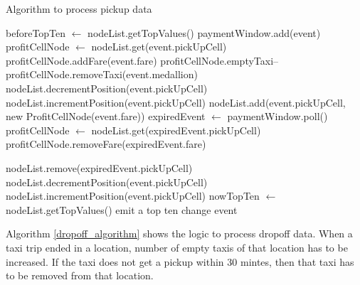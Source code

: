 \begin{algorithm}
\caption{Algorithm to process pickup data}
\label{pickup_algorithm}
\begin{algorithmic}
\small
\STATE beforeTopTen $ \leftarrow $ nodeList.getTopValues()
\STATE paymentWindow.add(event)
	\STATE profitCellNode $ \leftarrow $ nodeList.get(event.pickUpCell)
	\STATE profitCellNode.addFare(event.fare)
		\STATE profitCellNode.emptyTaxi--
		\STATE profitCellNode.removeTaxi(event.medallion)
	\ENDIF
		\STATE nodeList.decrementPosition(event.pickUpCell)
	\ELSE
		\STATE nodeList.incrementPosition(event.pickUpCell)	
	\ENDIF
\ELSE
	\STATE nodeList.add(event.pickUpCell, new ProfitCellNode(event.fare))
\ENDIF
{}
	\STATE expiredEvent $ \leftarrow $ paymentWindow.poll()
	\STATE profitCellNode $ \leftarrow $ nodeList.get(expiredEvent.pickUpCell)
	\STATE profitCellNode.removeFare(expiredEvent.fare)
	
		\STATE nodeList.remove(expiredEvent.pickUpCell)
		\STATE nodeList.decrementPosition(event.pickUpCell)
	\ELSE
		\STATE nodeList.incrementPosition(event.pickUpCell)
	\ENDIF
\ENDWHILE
\STATE nowTopTen $ \leftarrow $ nodeList.getTopValues()
	\STATE emit a top ten change event
\ENDIF		 

\end{algorithmic}
\end{algorithm}

Algorithm \ref{dropoff_algorithm} shows the logic to process dropoff data. When a taxi trip ended in a location, number of empty taxis of that location has to be increased. If the taxi does not get a pickup within 30 mintes, then that taxi has to be removed from that location.

